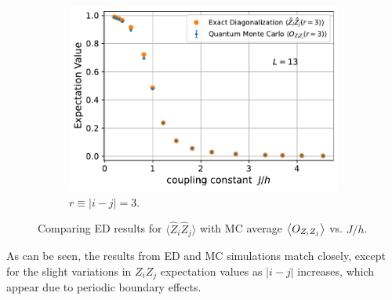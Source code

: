 \documentclass[../thesis_main.tex]{subfiles}
\begin{document}
\begin{figure}[!htb]
\begin{subfigure}[b]{0.45\textwidth}
        \centering
        \includegraphics[width=\textwidth]{images/13_site/L=13_ZZ(r=3).pdf}
        \caption{$r \equiv |i-j| = 3$.}
    \end{subfigure}
    \caption{Comparing ED results for $\langle \hat{Z}_i \hat{Z}_j \rangle$ with MC average $\expval{O_{Z_i Z_j}}$ vs. $J/h$.}
    \label{expvalZZ_ED_vs_MC_13}
\end{figure}
\FloatBarrier
\hspace{-1.5em}As can be seen, the results from ED and MC simulations match closely, except for the slight variations in $Z_i Z_j$ expectation values as $|i-j|$ increases, which appear due to periodic boundary effects.~\\~\\
\end{document}
